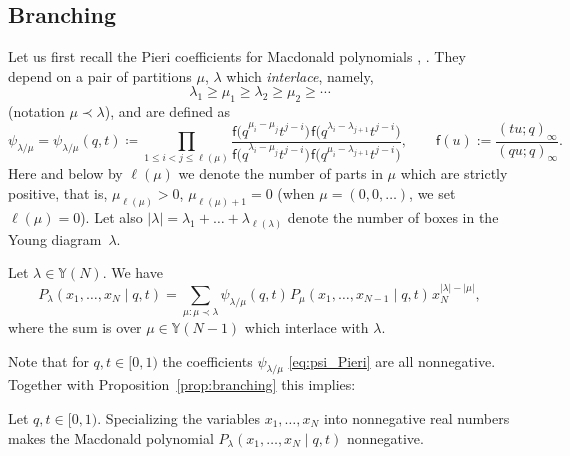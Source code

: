 \subsection{Branching}\label{sub:branching}

Let us first recall the Pieri coefficients for Macdonald polynomials
\cite[formula~(VI.6.24.ii)]{Macdonald1995},
\cite[formula~(2.11)]{BorodinCorwin2011Macdonald}.
They depend on a pair of partitions $\mu$, $\lambda$
which \emph{interlace}, namely,
\begin{equation*}%
	\lambda_1\ge \mu_1\ge \lambda_2\ge \mu_2\ge \cdots
\end{equation*}
(notation $\mu\prec \lambda$), and are defined as
\begin{equation}
	\label{eq:psi_Pieri}
	\psi_{\lambda/\mu}
	=
	\psi_{\lambda/\mu}(q,t)
	\coloneqq
	\prod_{1\le i<j\le \ell(\mu)}
	\frac{\mathsf{f}\big(q^{\mu_i-\mu_j}t^{j-i}\big)
	\hspace{1pt}\mathsf{f}\big(q^{\lambda_i-\lambda_{j+1}}t^{j-i}\big)}
	{\mathsf{f}\big(q^{\lambda_i-\mu_j}t^{j-i}\big)
	\hspace{1pt}\mathsf{f}\big(q^{\mu_i-\lambda_{j+1}}t^{j-i}\big)},
	\qquad
	\mathsf{f}(u):=\frac{(tu;q)_{\infty}}{(qu;q)_{\infty}}.
\end{equation}
Here and below by $\ell(\mu)$ we denote the number of
parts in $\mu$ which are strictly positive,
that is, $\mu_{\ell(\mu)}>0$, $\mu_{\ell(\mu)+1}=0$ (when $\mu=(0,0,\dots )$, we set $\ell(\mu)=0$).
Let also $|\lambda|=\lambda_1+\dots+\lambda_{\ell(\lambda)}$
denote the number of boxes in the Young diagram~$\lambda$.

\begin{Proposition}
	\label{prop:branching}
	Let $\lambda\in \mathbb{Y}(N)$.
	We have
	\begin{equation}
		\label{eq:branching}
		P_\lambda(x_1,\dots,x_N \mid q,t)
		=
		\sum_{\mu\colon\mu\prec\lambda}
		\psi_{\lambda/\mu}(q,t)\hspace{1pt} P_\mu(x_1,\dots,x_{N-1} \mid q,t )\hspace{1pt}
		x_N^{|\lambda|-|\mu|},
	\end{equation}
	where the sum is over
	$\mu\in \mathbb{Y}(N-1)$ which interlace with $\lambda$.
\end{Proposition}

Note that for $q,t\in [0,1)$ the coefficients $\psi_{\lambda/\mu}$
\eqref{eq:psi_Pieri} are all nonnegative.
Together with Proposition~\ref{prop:branching} this implies:
\begin{Corollary}
	\label{cor:nonnegative_spec}
	Let $q,t\in[0,1)$. Specializing the variables
	$x_1,\dots,x_N $ into
	nonnegative real numbers
	makes the Macdonald polynomial
	$P_\lambda(x_1,\dots,x_N\mid q,t)$ nonnegative.
\end{Corollary}


